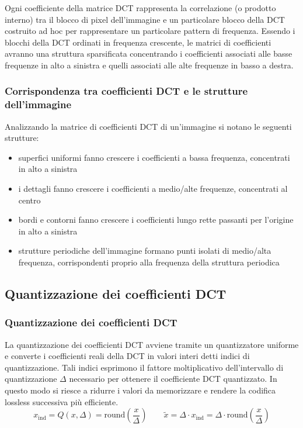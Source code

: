 Ogni coefficiente della matrice DCT rappresenta la correlazione (o prodotto interno) tra il blocco di pixel dell'immagine
e un particolare blocco della DCT costruito ad hoc per rappresentare un particolare pattern di frequenza. Essendo i blocchi
della DCT ordinati in frequenza crescente, le matrici di coefficienti avranno una struttura sparsificata concentrando
i coefficienti associati alle basse frequenze in alto a sinistra e quelli associati alle alte frequenze in basso a destra.

\subsubsection*{Corrispondenza tra coefficienti DCT e le strutture dell'immagine}
Analizzando la matrice di coefficienti DCT di un'immagine si notano le seguenti strutture:
\begin{itemize}
	\item superfici uniformi fanno crescere i coefficienti a bassa frequenza, concentrati in alto a sinistra
	\item i dettagli fanno crescere i coefficienti a medio/alte frequenze, concentrati al centro
	\item bordi e contorni fanno crescere i coefficienti lungo rette passanti per l'origine in alto a sinistra
	\item strutture periodiche dell'immagine formano punti isolati di medio/alta frequenza, corrispondenti proprio alla
	frequenza della struttura periodica
\end{itemize}

\subsection{Quantizzazione dei coefficienti DCT}
\subsubsection*{Quantizzazione dei coefficienti DCT}
La quantizzazione dei coefficienti DCT avviene tramite un quantizzatore uniforme e converte i coefficienti reali della DCT
in valori interi detti indici di quantizzazione. Tali indici esprimono il fattore moltiplicativo dell'intervallo di
quantizzazione \(\Delta\) necessario per ottenere il coefficiente DCT quantizzato. In questo modo si riesce a ridurre
i valori da memorizzare e rendere la codifica lossless successiva più efficiente.
\[x_\text{ind} = Q(x, \Delta) = \text{round} \left( \frac{x}{\Delta} \right) \qquad \tilde{x} = \Delta \cdot x_\text{ind} = \Delta \cdot \text{round} \left( \frac{x}{\Delta} \right)\]

